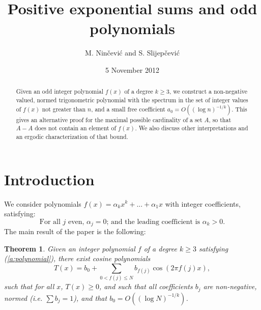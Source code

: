 \documentclass{amsart}
\newtheorem {theorem}{Theorem}
\numberwithin {equation}{section}
\begin{document}
\title[Positive exponential sums and odd polynomials]{Positive exponential
sums and odd polynomials}
\author{M. Nin\v{c}evi\'{c} and S. Slijep\v{c}evi\'{c}}
\address{Department of Mathematics, Bijeni\v{c}ka 30, Zagreb, Croatia}
\urladdr{}
\date{5 November 2012}

\begin{abstract}
Given an odd integer polynomial $f(x)$ of a degree $k\geq 3$, we construct a
non-negative valued, normed trigonometric polynomial with the spectrum in
the set of integer values of $f(x)$ not greater than $n$, and a small free
coefficient $a_{0}=O((\log n)^{-1/k})$. This gives an alternative proof for
the maximal possible cardinality of a set $A$, so that $A-A$ does not
contain an element of $f(x)$. We also discuss other interpretations and an
ergodic characterization of that bound.
\end{abstract}

\maketitle

\section{Introduction}

We consider polynomials $f(x)=\alpha _{k}x^{k}+...+\alpha _{1}x$ with
integer coefficients, satisfying:\begin{equation}
\text{For all }j\text{ even, }\alpha _{j}=0\text{;\ and the leading
coefficient is }\alpha _{k}>0\text{.}  \label{a:polynomial}
\end{equation}The main result of the paper is the following:

\begin{theorem}
\label{t:main1}Given an integer polynomial $f$ of a degree $k\geq 3$
satisfying (\ref{a:polynomial}), there exist cosine polynomials 
\begin{equation}
T(x)=b_{0}+\sum_{0<f(j)\leq N}b_{f(j)}\cos (2\pi f(j)x),  \label{r:type}
\end{equation}such that for all $x$, $T(x)\geq 0$, and such that all coefficients $b_{j}$
are non-negative, normed (i.e. $\sum b_{j}=1$), and that $b_{0}=O((\log
N)^{-1/k})$.
\end{theorem}
\end{document}
